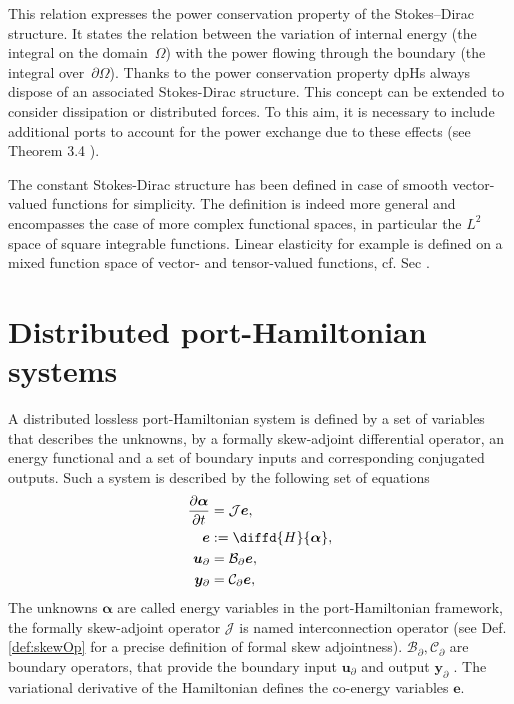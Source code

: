 This  relation expresses the  power  conservation property of the Stokes–Dirac structure. It states the relation between the variation of internal energy (the integral on the domain~$\Omega$) with the power flowing through the boundary (the integral over~$\partial\Omega$). Thanks to the power conservation property dpHs always dispose of an associated Stokes-Dirac structure. This concept can be extended to consider dissipation or distributed forces. To this aim, it is necessary to include additional ports to account for the power exchange due to these effects (see Theorem 3.4 \cite{macchelli2004modelling}). 


\begin{remark}
	The constant Stokes-Dirac structure has been defined in case of smooth vector-valued functions for simplicity.  The definition is indeed more general and encompasses the case of more complex functional spaces, in particular the $L^2$ space of square integrable functions.  Linear elasticity for example is defined on a mixed function space of vector- and tensor-valued functions, cf. Sec .
\end{remark}


\section{Distributed port-Hamiltonian systems}

A distributed lossless port-Hamiltonian system is defined by a set of variables that describes the unknowns, by a formally skew-adjoint differential operator, an energy functional and a set of boundary inputs and corresponding conjugated outputs. Such a system is described by the following set of equations
\begin{equation}\label{eq:phsys}
\begin{aligned}
\diffp{\bm{\alpha}}{t} &= \mathcal{J}\displaystyle \bm{e}, \vspace{3pt}\\
\bm{e} &:= \displaystyle \diffd{H}{\bm{\alpha}}, \\
\bm{u}_\partial &= \mathcal{B}_\partial  \displaystyle \bm{e}, \vspace{3pt}\\
\bm{y}_\partial &= \mathcal{C}_\partial \displaystyle \bm{e}, \vspace{3pt}
\end{aligned}
\end{equation}
The unknowns $\bm{\alpha}$ are called energy variables in the port-Hamiltonian framework, the formally skew-adjoint operator $\mathcal{J}$ is named interconnection operator (see Def. \ref{def:skewOp} for a precise definition of formal skew adjointness). $\mathcal{B}_\partial, \mathcal{C}_\partial$ are boundary operators, that provide the boundary input $\bm{u}_\partial$ and output $\bm{y}_\partial$ \cite[Chapter 4]{tucsnak2009observation}. The variational derivative of the Hamiltonian defines the co-energy variables $\bm{e}$.

